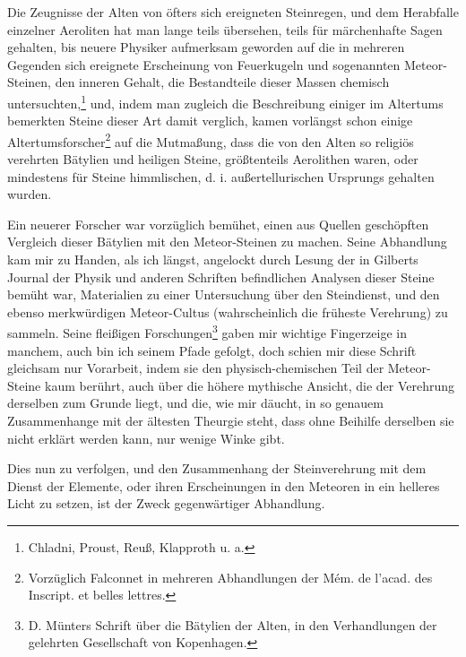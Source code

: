 \documentclass[a4paper, 11pt, oneside, polutonikogreek, german]{article}
\begin{document}
Die Zeugnisse der Alten von öfters sich ereigneten Steinregen, und dem Herabfalle einzelner Aeroliten hat man lange teils übersehen, teils für märchenhafte Sagen gehalten, bis neuere Physiker aufmerksam geworden auf die in mehreren Gegenden sich ereignete Erscheinung von Feuerkugeln und sogenannten Meteor-Steinen, den inneren Gehalt, die Bestandteile dieser Massen chemisch untersuchten,\footnote{Chladni, Proust, Reuß, Klapproth u. a.} und, indem man zugleich die Beschreibung einiger im Altertums bemerkten Steine dieser Art damit verglich, kamen vorlängst schon einige Altertumsforscher\footnote{Vorzüglich Falconnet in mehreren Abhandlungen der Mém. de l'acad. des Inscript. et belles lettres.} auf die Mutmaßung, dass die von den Alten so religiös verehrten Bätylien und heiligen Steine, größtenteils Aerolithen waren, oder mindestens für Steine himmlischen, d. i. außertellurischen Ursprungs gehalten wurden.

Ein neuerer Forscher war vorzüglich bemühet, einen aus Quellen geschöpften Vergleich dieser Bätylien mit den Meteor-Steinen zu machen. Seine Abhandlung kam mir zu Handen, als ich längst, angelockt durch Lesung der in Gilberts Journal der Physik und anderen Schriften befindlichen Analysen dieser Steine bemüht war, Materialien zu einer Untersuchung über den Steindienst, und den ebenso merkwürdigen Meteor-Cultus (wahrscheinlich die früheste Verehrung) zu sammeln. Seine fleißigen Forschungen\footnote{D. Münters Schrift über die Bätylien der Alten, in den Verhandlungen der gelehrten Gesellschaft von Kopenhagen.} gaben mir wichtige Fingerzeige in manchem, auch bin ich seinem Pfade gefolgt, doch schien mir diese Schrift gleichsam nur Vorarbeit, indem sie den physisch-chemischen Teil der Meteor-Steine kaum berührt, auch über die höhere mythische Ansicht, die der Verehrung derselben zum Grunde liegt, und die, wie mir däucht, in so genauem Zusammenhange mit der ältesten Theurgie steht, dass ohne Beihilfe derselben sie nicht erklärt werden kann, nur wenige Winke gibt.

Dies nun zu verfolgen, und den Zusammenhang der Steinverehrung mit dem Dienst der Elemente, oder ihren Erscheinungen in den Meteoren in ein helleres Licht zu setzen, ist der Zweck gegenwärtiger Abhandlung.
\clearpage
\end{document}
